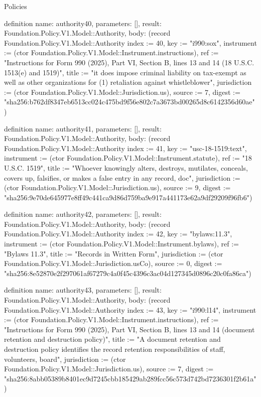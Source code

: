 \begin{lexlean}{Policies}
\begin{semanticmodule}
definition{
  name: authority40,
  parameters: [],
  result: Foundation.Policy.V1.Model::Authority,
  body: (record Foundation.Policy.V1.Model::Authority {index := 40, key := "i990:sox", instrument := (ctor Foundation.Policy.V1.Model::Instrument.instructions), ref := "Instructions for Form 990 (2025), Part VI, Section B, lines 13 and 14 (18 U.S.C. 1513(e) and 1519)", title := "it does impose criminal liability on tax-exempt as well as other organizations for (1) retaliation against whistleblower", jurisdiction := (ctor Foundation.Policy.V1.Model::Jurisdiction.us), source := 7, digest := "sha256:b762df8347eb6513cc024c475bd9f56e802c7a3673bd00265d8c6142356d60ae"})
}

definition{
  name: authority41,
  parameters: [],
  result: Foundation.Policy.V1.Model::Authority,
  body: (record Foundation.Policy.V1.Model::Authority {index := 41, key := "usc-18-1519:text", instrument := (ctor Foundation.Policy.V1.Model::Instrument.statute), ref := "18 U.S.C. 1519", title := "Whoever knowingly alters, destroys, mutilates, conceals, covers up, falsifies, or makes a false entry in any record, doc", jurisdiction := (ctor Foundation.Policy.V1.Model::Jurisdiction.us), source := 9, digest := "sha256:9e70de645977e8ff49c441ca9d86d759ba9e917a441173e62a9df29209f96fb6"})
}

definition{
  name: authority42,
  parameters: [],
  result: Foundation.Policy.V1.Model::Authority,
  body: (record Foundation.Policy.V1.Model::Authority {index := 42, key := "bylaws:11.3", instrument := (ctor Foundation.Policy.V1.Model::Instrument.bylaws), ref := "Bylaws 11.3", title := "Records in Written Form", jurisdiction := (ctor Foundation.Policy.V1.Model::Jurisdiction.usCo), source := 0, digest := "sha256:8e52870e2f297061af67279c4a0f45c4396c3ac04d127345d0896c20c0fa86ca"})
}

definition{
  name: authority43,
  parameters: [],
  result: Foundation.Policy.V1.Model::Authority,
  body: (record Foundation.Policy.V1.Model::Authority {index := 43, key := "i990:l14", instrument := (ctor Foundation.Policy.V1.Model::Instrument.instructions), ref := "Instructions for Form 990 (2025), Part VI, Section B, lines 13 and 14 (document retention and destruction policy)", title := "A document retention and destruction policy identifies the record retention responsibilities of staff, volunteers, board", jurisdiction := (ctor Foundation.Policy.V1.Model::Jurisdiction.us), source := 7, digest := "sha256:8abb05389b8401ec9d7245cbb185429ab289fcc56c573d742bd7236301f2b61a"})
}


\end{semanticmodule}
\end{lexlean}
